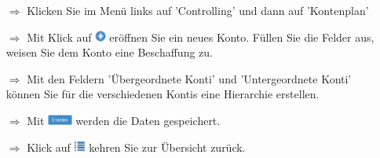 \documentclass{article}
\begin{document}
\begin{centering}
\end{centering}


\begin{multicols}{2}

\begin{tcolorbox}[colback=blue!5,colframe=blue!40!black,title=Kontenplan erstellen]
\begin{itemize}
  \item[$\Longrightarrow$] Klicken Sie im Menü links auf 'Controlling' und dann auf 'Kontenplan'
  \item[$\Longrightarrow$] Mit Klick auf \includegraphics[height=10pt]{Icons/Plussymbol.png} eröffnen Sie ein neues Konto. Füllen Sie die Felder aus, weisen Sie dem Konto eine Beschaffung zu.
	\item[$\Longrightarrow$] Mit den Feldern 'Übergeordnete Konti' und 'Untergeordnete Konti' können Sie für die verschiedenen Kontis eine Hierarchie erstellen.
  \item[$\Longrightarrow$] Mit \includegraphics[height=10pt]{Icons/B_Erstellen.jpg} werden die Daten gespeichert.
  \item[$\Longrightarrow$] Klick auf \includegraphics[height=10pt]{Icons/Listensymbol_zurueck.png} kehren Sie zur Übersicht zurück. 
\end{itemize}
\begin{centering}
\end{centering}
\end{tcolorbox}



\end{multicols}
\end{document}
